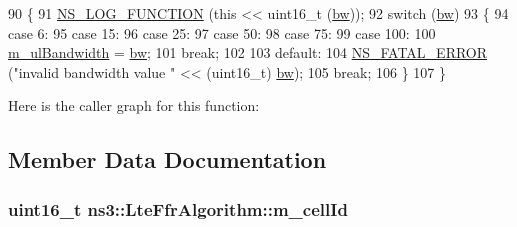 \begin{DoxyCode}
90 \{
91   \hyperlink{log-macros-disabled_8h_a90b90d5bad1f39cb1b64923ea94c0761}{NS\_LOG\_FUNCTION} (\textcolor{keyword}{this} << uint16\_t (\hyperlink{generate__test__data__lte__spectrum__model_8m_a3f7228a3941f19f282647a09dd494528}{bw}));
92   \textcolor{keywordflow}{switch} (\hyperlink{generate__test__data__lte__spectrum__model_8m_a3f7228a3941f19f282647a09dd494528}{bw})
93     \{
94     \textcolor{keywordflow}{case} 6:
95     \textcolor{keywordflow}{case} 15:
96     \textcolor{keywordflow}{case} 25:
97     \textcolor{keywordflow}{case} 50:
98     \textcolor{keywordflow}{case} 75:
99     \textcolor{keywordflow}{case} 100:
100       \hyperlink{classns3_1_1LteFfrAlgorithm_acfa0105633ee5c27538c3309eb132d21}{m\_ulBandwidth} = \hyperlink{generate__test__data__lte__spectrum__model_8m_a3f7228a3941f19f282647a09dd494528}{bw};
101       \textcolor{keywordflow}{break};
102 
103     \textcolor{keywordflow}{default}:
104       \hyperlink{group__fatal_ga5131d5e3f75d7d4cbfd706ac456fdc85}{NS\_FATAL\_ERROR} (\textcolor{stringliteral}{"invalid bandwidth value "} << (uint16\_t) \hyperlink{generate__test__data__lte__spectrum__model_8m_a3f7228a3941f19f282647a09dd494528}{bw});
105       \textcolor{keywordflow}{break};
106     \}
107 \}
\end{DoxyCode}


Here is the caller graph for this function\+:




\subsection{Member Data Documentation}
\subsubsection[{\texorpdfstring{m\+\_\+cell\+Id}{m_cellId}}]{\setlength{\rightskip}{0pt plus 5cm}uint16\+\_\+t ns3\+::\+Lte\+Ffr\+Algorithm\+::m\+\_\+cell\+Id\hspace{0.3cm}{\ttfamily [protected]}}\hypertarget{classns3_1_1LteFfrAlgorithm_a0d6bc37b568679f27a18808d9cb36803}{}\label{classns3_1_1LteFfrAlgorithm_a0d6bc37b568679f27a18808d9cb36803}
